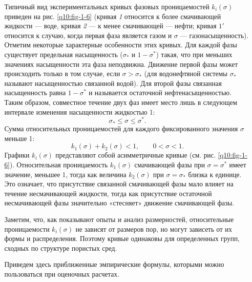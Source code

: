 Типичный вид экспериментальных кривых фазовых проницаемостей $k_i(\sigma)$ приведен на рис. \ref{q10:fig-1-6} (кривая \textit{1} относится к более смачивающей жидкости --- воде, кривая \textit{2} --- к менее смачивающей --- нефти; кривая $1'$ относится к случаю, когда первая фаза является газом и $\sigma$ --- газонасыщенность). Отметим некоторые характерные особенности этих кривых. Для каждой фазы существует предельная насыщенность ($\sigma_*$ и $1-\sigma^*$) такая, что при меньших значениях насыщенности эта фаза неподвижна. Движение первой фазы может происходить только в том случае, если $\sigma>\sigma_*$ (для водонефтяной системы $\sigma_*$ называют насыщенностью связанной водой). Для второй фазы связанная насыщенность равна $1-\sigma^*$ и называется остаточной нефтенасыщенностью. Таким образом, совместное течение двух фаз имеет место лишь в следующем интервале изменения насыщенности жидкостью 1:
\[\sigma_*\le\sigma\le\sigma^*.\]
Сумма относительных проницаемостей для каждого фиксированного значения $\sigma$ меньше 1:
\[k_1(\sigma)+k_2(\sigma)<1,\qquad0<\sigma<1.\]
Графики $k_i(\sigma)$ представляют собой асимметричные кривые (см. рис. \ref{q10:fig-1-6}). Относительная проницаемость $k_1(\sigma)$ смачивающей фазы при $\sigma=\sigma^*$ имеет значение, меньшее 1, тогда как величина $k_2(\sigma)$ при $\sigma=\sigma_*$ близка к единице. Это означает, что присутствие связанной смачивающей фазы мало влияет на течение несмачивающей
жидкости, тогда как присутствие остаточной несмачивающей фазы значительно «стесняет» движение смачивающей фазы.

Заметим, что, как показывают опыты и анализ размерностей, относительные проницаемости $k_i(\sigma)$ не зависят от размеров пор, но могут зависеть от их формы и распределения. Поэтому кривые одинаковы для определенных групп, сходных по структуре пористых сред.

Приведем здесь приближенные эмпирические формулы, которыми можно пользоваться при оценочных расчетах.

